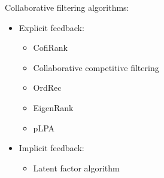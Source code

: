 \documentclass[a4paper]{article}
\begin{document}
Collaborative filtering algorithms:
\begin{itemize}
  \item Explicit feedback:
    \begin{itemize}
      \item CofiRank \cite{weimer2007cofi}
      \item Collaborative competitive filtering \cite{yang2011collaborative}
      \item OrdRec \cite{koren2011ordrec}
      \item EigenRank \cite{liu2008eigenrank}
      \item pLPA \cite{liu2009probabilistic}
    \end{itemize}
  \item Implicit feedback:
    \begin{itemize}
      \item Latent factor algorithm \cite{hu2008collaborative}
    \end{itemize}
\end{itemize}



\end{document}
